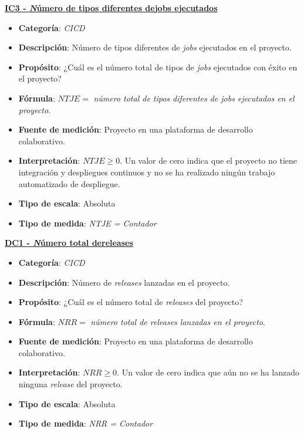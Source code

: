 \textbf{\underline{IC3 - \textit Número de tipos diferentes de{jobs} ejecutados}}
\begin{itemize}
	\item \textbf{Categoría}: \textit{CICD}
	\item \textbf{Descripción}: Número de tipos diferentes de \textit{jobs} ejecutados en el proyecto.
	\item \textbf{Propósito}: ¿Cuál es el número total de tipos de \textit{jobs} ejecutados con éxito en el proyecto?
	\item \textbf{Fórmula}: $NTJE =$ \textit{número total de tipos diferentes de jobs ejecutados en el proyecto}.
	\item \textbf{Fuente de medición}: Proyecto en una plataforma de desarrollo colaborativo.
	\item \textbf{Interpretación}: $NTJE \geq 0$. Un valor de cero indica que el proyecto no tiene integración y despliegues continuos y no se ha realizado ningún trabajo automatizado de despliegue.
	\item \textbf{Tipo de escala}: Absoluta
	\item \textbf{Tipo de medida}: \textit{NTJE = Contador}
\end{itemize}

\textbf{\underline{DC1 - \textit Número total de{releases}}}
\begin{itemize}
	\item \textbf{Categoría}: \textit{CICD}
	\item \textbf{Descripción}: Número de \textit{releases} lanzadas en el proyecto.
	\item \textbf{Propósito}: ¿Cuál es el número total de \textit{releases} del  proyecto?
	\item \textbf{Fórmula}: $NRR =$ \textit{número total de releases lanzadas en el proyecto}.
	\item \textbf{Fuente de medición}: Proyecto en una plataforma de desarrollo colaborativo.
	\item \textbf{Interpretación}: $NRR \geq 0$. Un valor de cero indica que aún no se ha lanzado ninguna \textit{release} del proyecto.
	\item \textbf{Tipo de escala}: Absoluta
	\item \textbf{Tipo de medida}: \textit{NRR = Contador}
\end{itemize}

